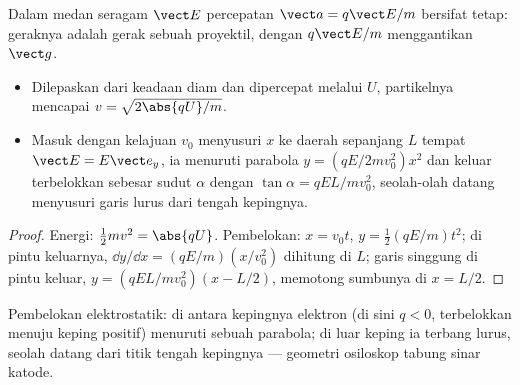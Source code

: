 \begin{proposition}\label{prop:b1:charged-particles:efield}
Dalam medan seragam $\vect E$ percepatan $\vect a = q\vect E/m$ bersifat
tetap: geraknya adalah gerak sebuah proyektil, dengan $q\vect E/m$ menggantikan
$\vect g$.
\begin{itemize}
  \item Dilepaskan dari keadaan diam dan dipercepat melalui  $U$,
        partikelnya mencapai $v = \sqrt{2\abs{qU}/m}$.
  \item Masuk dengan kelajuan $v_0$ menyusuri $x$ ke daerah sepanjang $L$ tempat
        $\vect E = E\vect e_y$, ia menuruti parabola $y = (qE/2mv_0^2)x^2$
        dan keluar terbelokkan sebesar sudut $\alpha$ dengan $\tan\alpha =
        qEL/mv_0^2$, seolah-olah datang menyusuri garis lurus dari
        tengah kepingnya.
\end{itemize}
\end{proposition}

\begin{proof}
Energi: $\tfrac12 mv^2 = \abs{qU}$. Pembelokan: $x = v_0t$, $y =
\tfrac12(qE/m)t^2$; di pintu keluarnya, $\dd y/\dd x = (qE/m)(x/v_0^2)$ dihitung
di $L$; garis singgung di pintu keluar, $y = (qEL/mv_0^2)(x - L/2)$, memotong
sumbunya di $x = L/2$.
\end{proof}

\begin{omfigure}

{\small Pembelokan elektrostatik: di antara kepingnya elektron (di sini
$q < 0$, terbelokkan menuju keping positif) menuruti sebuah parabola; di
luar keping ia terbang lurus, seolah datang dari titik tengah kepingnya
--- geometri osiloskop tabung sinar katode.}
\end{omfigure}

